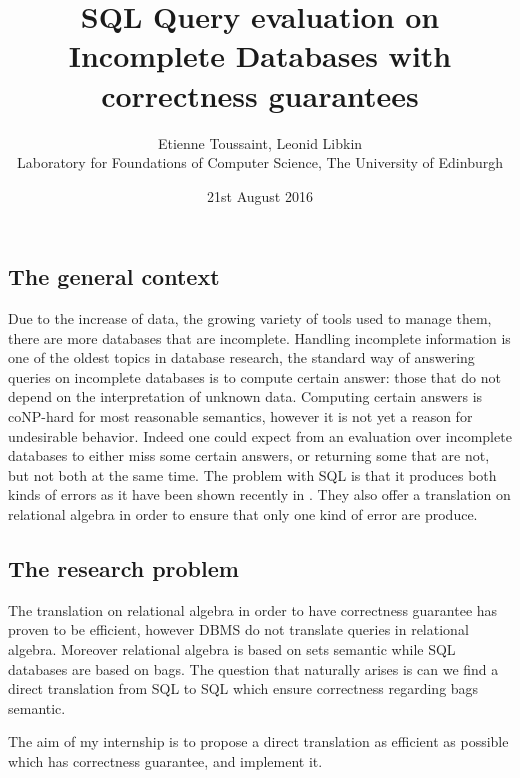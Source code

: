 \documentclass{article}
\newenvironment{point}[1]%
{\subsection*{#1}}%
{}
\begin{document}
\title{SQL Query evaluation on Incomplete Databases with correctness guarantees }

\author{Etienne Toussaint, Leonid Libkin \\
	Laboratory for Foundations of Computer Science, The University of Edinburgh }

\date{21st August 2016}

\maketitle

\pagestyle{empty} %
\thispagestyle{empty}



\begin{point}{The general context}
  Due to the increase of data, the growing variety of tools used to manage them, there are more databases that are incomplete.  Handling incomplete information is one of the oldest topics in database research, the standard way of answering queries on incomplete databases is to compute certain answer:  those that do not depend on the interpretation of unknown data. Computing certain answers is coNP-hard for most reasonable semantics, however 
  it is not yet a reason for undesirable behavior. Indeed one could expect from an evaluation over incomplete databases to either miss some certain answers, or returning some that are not, but not both at the same time. 
  The problem with SQL is that it produces both kinds of errors as it have been shown recently in . They also offer a translation on relational algebra in order to ensure that only one kind of error are produce.

\end{point}

\begin{point}{The research problem}
	
 The translation on relational algebra in order to have correctness guarantee has proven to be efficient, however DBMS do not translate queries in relational algebra. Moreover relational algebra is based on sets semantic while SQL databases are based on bags. The question that naturally arises is can we find a direct translation from SQL to SQL which ensure correctness regarding bags semantic.
 
 The aim of my internship is to propose a direct translation as efficient as possible which has correctness guarantee, and implement it.  

\end{point}
\end{document}
